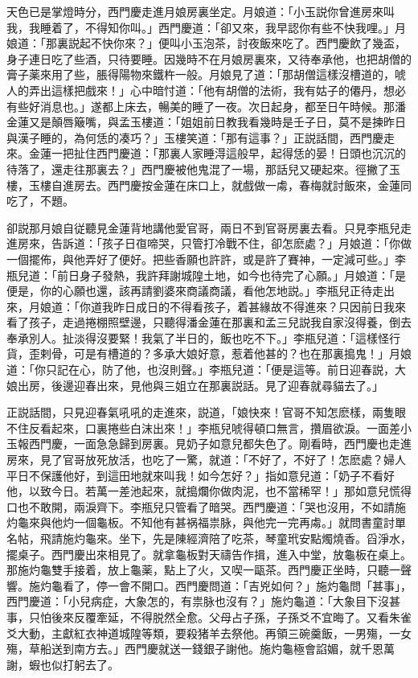 天色已是掌燈時分，西門慶走進月娘房裏坐定。月娘道：「小玉説你曾進房來叫我，我睡着了，不得知你叫。」西門慶道：「卻又來，我早認你有些不快我哩。」月娘道：「那裏説起不快你來？」便叫小玉泡茶，討夜飯來吃了。西門慶飲了幾盃，身子連日吃了些酒，只待要睡。因幾時不在月娘房裏來，又待奉承他，也把胡僧的膏子薬來用了些，脹得陽物來鐵杵一般。月娘見了道：「那胡僧這樣沒槽道的，唬人的弄出這樣把戲來！」心中暗忖道：「他有胡僧的法術，我有姑子的僊丹，想必有些好消息也。」遂都上床去，暢美的睡了一夜。次日起身，都至日午時候。那潘金蓮又是顛唇簸嘴，與孟玉樓道：「姐姐前日教我看幾時是壬子日，莫不是揀昨日與漢子睡的，為何恁的凑巧？」玉樓笑道：「那有這事？」正説話間，西門慶走來。金蓮一把扯住西門慶道：「那裏人家睡淂這般早，起得恁的晏！日頭也沉沉的待落了，還走往那裏去？」西門慶被他鬼混了一場，那話兒又硬起來。徑撇了玉樓，玉樓自進房去。西門慶按金蓮在床口上，就戲做一䖏，春梅就討飯來，金蓮同吃了，不題。

卻説那月娘自従聽見金蓮背地講他愛官哥，兩日不到官哥房裏去看。只見李瓶兒走進房來，告訴道：「孩子日亱啼哭，只管打冷戰不住，卻怎麽處？」月娘道：「你做一個擺佈，與他弄好了便好。把些香願也許許，或是許了賽神，一定減可些。」李瓶兒道：「前日身子發熱，我許拜謝城隍土地，如今也待完了心願。」月娘道：「是便是，你的心願也還，該再請劉婆來商議商議，看他怎地説。」李瓶兒正待走出來，月娘道：「你道我昨日成日的不得看孩子，着甚緣故不得進來？只因前日我來看了孩子，走過捲棚照壁邊，只聽得潘金蓮在那裏和孟三兒説我自家沒得養，倒去奉承別人。扯淡得沒要緊！我氣了半日的，飯也吃不下。」李瓶兒道：「這樣怪行貨，歪剌骨，可是有槽道的？多承大娘好意，惹着他甚的？也在那裏搗鬼！」月娘道：「你只記在心，防了他，也沒則聲。」李瓶兒道：「便是這等。前日迎春説，大娘出房，後邊迎春出來，見他與三姐立在那裏説話。見了迎春就尋貓去了。」

正説話間，只見迎春氣吼吼的走進來，説道，「娘快來！官哥不知怎麽樣，兩隻眼不住反看起來，口裏捲些白沫出來！」李瓶兒唬得頓口無言，攢眉欲淚。一面差小玉報西門慶，一面急急歸到房裏。見奶子如意兒都失色了。剛看時，西門慶也走進房來，見了官哥放死放活，也吃了一驚，就道：「不好了，不好了！怎麽處？婦人平日不保護他好，到這田地就來叫我！如今怎好？」指如意兒道：「奶子不看好他，以致今日。若萬一差池起來，就搗爛你做肉泥，也不當稀罕！」那如意兒慌得口也不敢開，兩淚齊下。李瓶兒只管看了暗哭。西門慶道：「哭也沒用，不如請施灼龜來與他灼一個龜板。不知他有甚祸福祟脉，與他完一完再䖏。」就問書童討單名帖，飛請施灼龜來。坐下，先是陳經濟陪了吃茶，琴童玳安點燭燒香。舀淨水，擺桌子。西門慶出來相見了。就拿龜板對天禱告作揖，進入中堂，放龜板在桌上。那施灼龜雙手接着，放上龜薬，點上了火，又喫一甌茶。西門慶正坐時，只聽一聲響。施灼龜看了，停一會不開口。西門慶問道：「吉兇如何？」施灼龜問「甚事」，西門慶道：「小兒病症，大象怎的，有祟脉也沒有？」施灼龜道：「大象目下沒甚事，只怕後來反覆牽延，不得脱然全愈。父母占子孫，子孫爻不宜晦了。又看朱雀爻大動，主獻紅衣神道城隍等類，要殺猪羊去祭他。再領三碗羹飯，一男殤，一女殤，草船送到南方去。」西門慶就送一錢銀子謝他。施灼龜極會諂媚，就千恩萬謝，蝦也似打躬去了。

